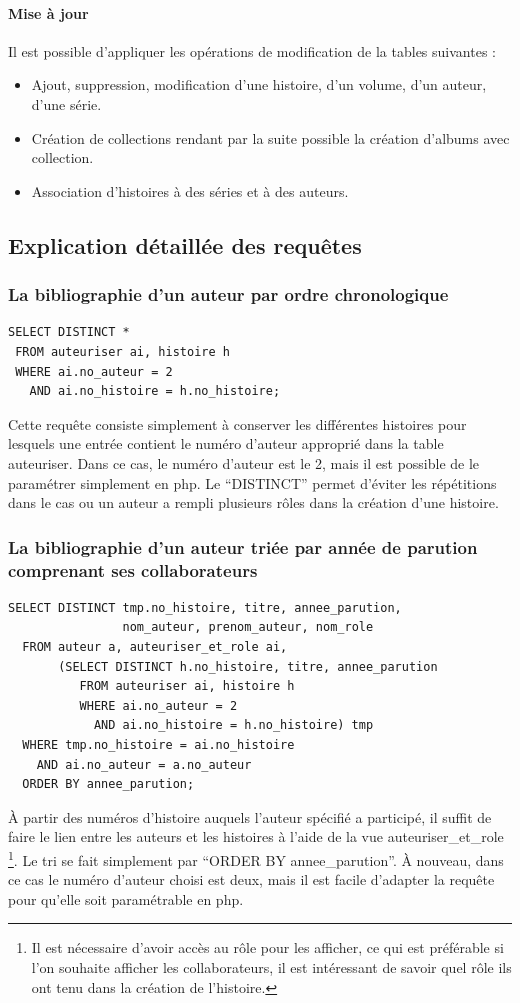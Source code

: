 \documentclass[12pt]{article}
\begin{document}
\paragraph{Mise à jour}
Il est possible d'appliquer les opérations de modification de la tables
suivantes :
\begin{itemize}
	\item Ajout, suppression, modification d’une histoire, d’un volume, d’un
		auteur, d'une série.
	\item Création de collections rendant par la suite possible la création
		d'albums avec collection.
	\item Association d'histoires à des séries et à des auteurs.
\end{itemize}

\subsection{Explication détaillée des requêtes}

\subsubsection*{La bibliographie d'un auteur par ordre chronologique}
\begin{lstlisting}
SELECT DISTINCT *
 FROM auteuriser ai, histoire h
 WHERE ai.no_auteur = 2
   AND ai.no_histoire = h.no_histoire;
\end{lstlisting}
Cette requête consiste simplement à conserver les différentes histoires pour
lesquels une entrée contient le numéro d'auteur approprié dans la table
auteuriser. Dans ce cas, le numéro d'auteur est le 2, mais il est possible
de le paramétrer simplement en php. Le ``DISTINCT'' permet d'éviter les
répétitions dans le cas ou un auteur a rempli plusieurs rôles dans la
création d'une histoire.

\subsubsection*{La bibliographie d'un auteur triée par année de parution
comprenant ses collaborateurs}
\begin{lstlisting}
SELECT DISTINCT tmp.no_histoire, titre, annee_parution,
                nom_auteur, prenom_auteur, nom_role
  FROM auteur a, auteuriser_et_role ai,
       (SELECT DISTINCT h.no_histoire, titre, annee_parution
          FROM auteuriser ai, histoire h
          WHERE ai.no_auteur = 2
            AND ai.no_histoire = h.no_histoire) tmp
  WHERE tmp.no_histoire = ai.no_histoire
    AND ai.no_auteur = a.no_auteur
  ORDER BY annee_parution;
\end{lstlisting}
À partir des numéros d'histoire auquels l'auteur spécifié a participé, il
suffit de faire le lien entre les auteurs et les histoires à l'aide de la vue
auteuriser\_et\_role \footnote{Il est nécessaire d'avoir accès au rôle pour
les afficher, ce qui est préférable si l'on souhaite afficher les
collaborateurs, il est intéressant de savoir quel rôle ils ont tenu dans la
création de l'histoire.}. Le tri se fait simplement par
``ORDER BY annee\_parution''. À nouveau, dans ce cas le numéro d'auteur
choisi est deux, mais il est facile d'adapter la requête pour qu'elle soit
paramétrable en php.
\end{document}
